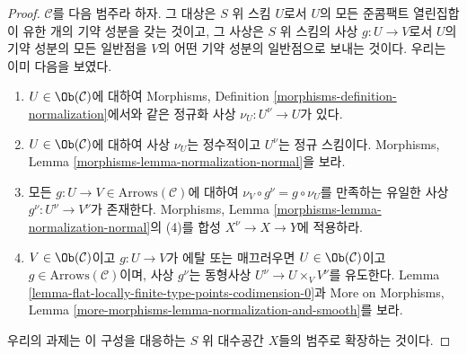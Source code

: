 \begin{proof}
$\mathcal{C}$를 다음 범주라 하자. 그 대상은 $S$ 위 스킴 $U$로서 $U$의
모든 준콤팩트 열린집합이 유한 개의 기약 성분을 갖는 것이고, 그 사상은
$S$ 위 스킴의 사상 $g : U \to V$로서 $U$의 기약 성분의 모든 일반점을
$V$의 어떤 기약 성분의 일반점으로 보내는 것이다. 우리는 이미 다음을
보였다.
\begin{enumerate}
\item[(a)] $U \in \Ob(\mathcal{C})$에 대하여 Morphisms, Definition
\ref{morphisms-definition-normalization}에서와 같은 정규화 사상
$\nu_U : U^\nu \to U$가 있다.
\item[(b)] $U \in \Ob(\mathcal{C})$에 대하여 사상 $\nu_U$는 정수적이고
$U^\nu$는 정규 스킴이다. Morphisms, Lemma
\ref{morphisms-lemma-normalization-normal}을 보라.
\item[(c)] 모든 $g : U \to V \in \text{Arrows}(\mathcal{C})$에 대하여
$\nu_V \circ g^\nu = g \circ \nu_U$를 만족하는 유일한 사상
$g^\nu : U^\nu \to V^\nu$가 존재한다. Morphisms, Lemma
\ref{morphisms-lemma-normalization-normal}의 (4)를 합성
$X^\nu \to X \to Y$에 적용하라.
\item[(d)] $V \in \Ob(\mathcal{C})$이고 $g : U \to V$가 에탈 또는
매끄러우면 $U \in \Ob(\mathcal{C})$이고
$g \in \text{Arrows}(\mathcal{C})$이며, 사상 $g^\nu$는 동형사상
$U^\nu \to U \times_V V^\nu$를 유도한다. Lemma
\ref{lemma-flat-locally-finite-type-points-codimension-0}과 More on
Morphisms, Lemma \ref{more-morphisms-lemma-normalization-and-smooth}를
보라.
\end{enumerate}
우리의 과제는 이 구성을 대응하는 $S$ 위 대수공간 $X$들의 범주로
확장하는 것이다.


\end{proof}
